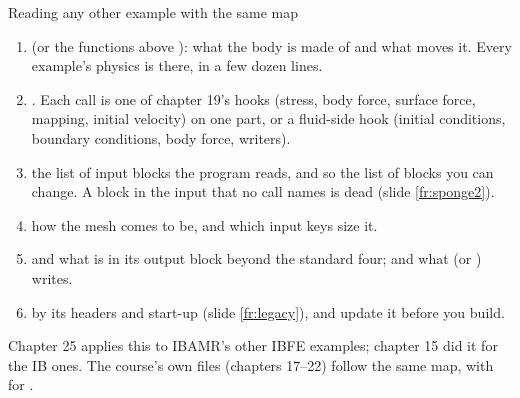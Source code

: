 \documentclass[aspectratio=169,11pt]{beamer}
\begin{document}
\begin{frame}{Reading any other example with the same map}
\label{fr:recipe}
\footnotesize
\begin{enumerate}
  \item {} (or the functions above ): what the body is made of and what moves it. Every example's physics is there, in a few dozen lines.
  \item {} . Each call is one of chapter 19's hooks (stress, body force, surface force, mapping, initial velocity) on one part, or a fluid-side hook (initial conditions, boundary conditions, body force, writers).
  \item {} the list of input blocks the program reads, and so the list of blocks you can change. A block in the input that no call names is dead (slide \ref{fr:sponge2}).
  \item {} how the mesh comes to be, and which input keys size it.
  \item {} and what is in its output block beyond the standard four; and what  (or ) writes.
  \item {} by its headers and start-up (slide \ref{fr:legacy}), and update it before you build.
\end{enumerate}
\begin{punchbox}
\footnotesize Chapter 25 applies this to IBAMR's other IBFE examples; chapter 15 did it for the IB ones. The course's own files (chapters 17--22) follow the same map, with  for .
\end{punchbox}
\end{frame}
\end{document}
